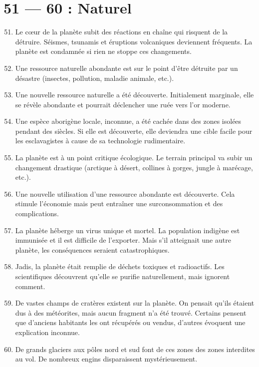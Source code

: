 \documentclass{article}
\begin{document}
\section*{51 --- 60 : Naturel}
\begin{enumerate}
	\setcounter{enumi}{50}
	\item Le cœur de la planète subit des réactions en chaîne qui risquent de la détruire. Séismes, tsunamis et éruptions volcaniques deviennent fréquents. La planète est condamnée si rien ne stoppe ces changements.
	\item Une ressource naturelle abondante est sur le point d’être détruite par un désastre (insectes, pollution, maladie animale, etc.).
	\item Une nouvelle ressource naturelle a été découverte. Initialement marginale, elle se révèle abondante et pourrait déclencher une ruée vers l’or moderne.
	\item Une espèce aborigène locale, inconnue, a été cachée dans des zones isolées pendant des siècles. Si elle est découverte, elle deviendra une cible facile pour les esclavagistes à cause de sa technologie rudimentaire.
	\item La planète est à un point critique écologique. Le terrain principal va subir un changement drastique (arctique à désert, collines à gorges, jungle à marécage, etc.).
	\item Une nouvelle utilisation d’une ressource abondante est découverte. Cela stimule l’économie mais peut entraîner une surconsommation et des complications.
	\item La planète héberge un virus unique et mortel. La population indigène est immunisée et il est difficile de l’exporter. Mais s’il atteignait une autre planète, les conséquences seraient catastrophiques.
	\item Jadis, la planète était remplie de déchets toxiques et radioactifs. Les scientifiques découvrent qu’elle se purifie naturellement, mais ignorent comment.
	\item De vastes champs de cratères existent sur la planète. On pensait qu’ils étaient dus à des météorites, mais aucun fragment n’a été trouvé. Certains pensent que d’anciens habitants les ont récupérés ou vendus, d’autres évoquent une explication inconnue.
	\item De grands glaciers aux pôles nord et sud font de ces zones des zones interdites au vol. De nombreux engins disparaissent mystérieusement.
\end{enumerate}
\end{document}
